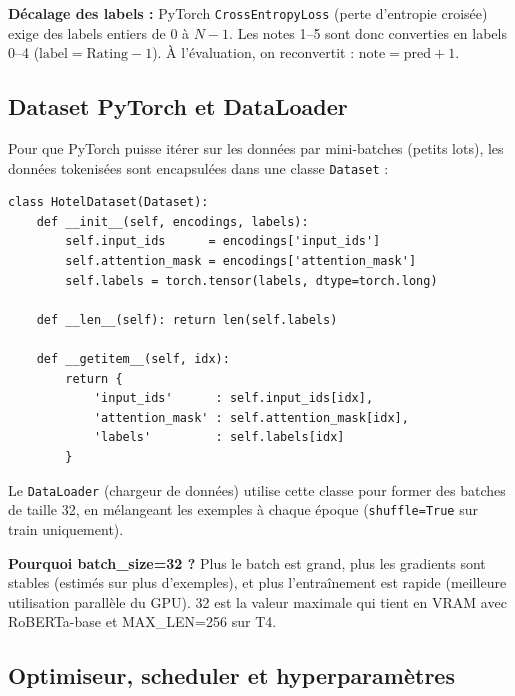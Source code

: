 \documentclass[12pt, a4paper]{article}
\begin{document}
\textbf{Décalage des labels :}
PyTorch \texttt{CrossEntropyLoss} (perte d'entropie croisée) exige des labels
entiers de $0$ à $N-1$. Les notes 1--5 sont donc converties en labels 0--4
($\text{label} = \text{Rating} - 1$). À l'évaluation, on reconvertit : $\text{note} = \text{pred} + 1$.

\subsection{Dataset PyTorch et DataLoader}

Pour que PyTorch puisse itérer sur les données par mini-batches (petits lots),
les données tokenisées sont encapsulées dans une classe \texttt{Dataset} :

\begin{lstlisting}[caption={Dataset PyTorch pour les avis d'hôtels}]
class HotelDataset(Dataset):
    def __init__(self, encodings, labels):
        self.input_ids      = encodings['input_ids']
        self.attention_mask = encodings['attention_mask']
        self.labels = torch.tensor(labels, dtype=torch.long)

    def __len__(self): return len(self.labels)

    def __getitem__(self, idx):
        return {
            'input_ids'      : self.input_ids[idx],
            'attention_mask' : self.attention_mask[idx],
            'labels'         : self.labels[idx]
        }
\end{lstlisting}

Le \texttt{DataLoader} (chargeur de données) utilise cette classe pour former des
batches de taille 32, en mélangeant les exemples à chaque époque (\texttt{shuffle=True}
sur train uniquement).

\textbf{Pourquoi batch\_size=32 ?}
Plus le batch est grand, plus les gradients sont stables (estimés sur plus d'exemples),
et plus l'entraînement est rapide (meilleure utilisation parallèle du GPU).
32 est la valeur maximale qui tient en VRAM avec RoBERTa-base et MAX\_LEN=256 sur T4.

\subsection{Optimiseur, scheduler et hyperparamètres}
\end{document}
